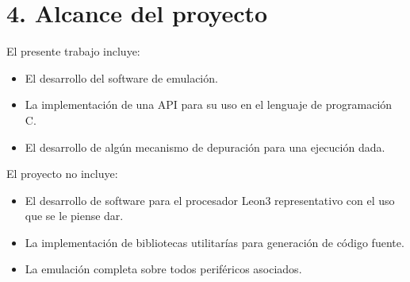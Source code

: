 \section{4. Alcance del proyecto}
\label{sec:alcance}

El presente trabajo incluye:

\begin{itemize}
\item El desarrollo del software de emulación.
\item La implementación de una API para su uso en el lenguaje de programación C.
\item El desarrollo de algún mecanismo de depuración para una ejecución dada.
\end{itemize}

El proyecto no incluye:

\begin{itemize}
\item El desarrollo de software para el procesador Leon3 representativo con el uso que se le piense dar.
\item La implementación de bibliotecas utilitarías para generación de código fuente.
\item La emulación completa sobre todos periféricos asociados.
\end{itemize}

